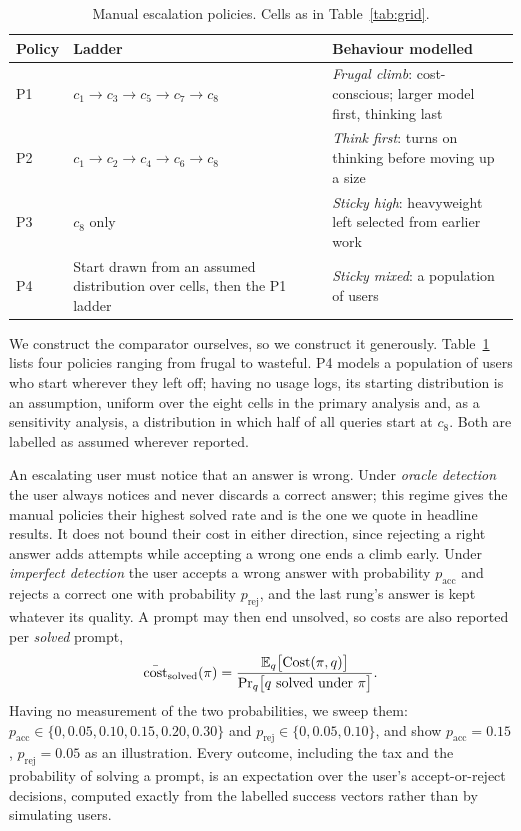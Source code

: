 \begin{table}[ht]
\centering
\caption{Manual escalation policies. Cells as in Table~\ref{tab:grid}.}
\label{tab:policies}
\begin{tabularx}{\textwidth}{@{}l p{3.4cm} >{\raggedright\arraybackslash}X@{}}
\toprule
Policy & Ladder & Behaviour modelled \\
\midrule
P1 & $c_1{\to}c_3{\to}c_5{\to}c_7{\to}c_8$ & \emph{Frugal climb}: cost-conscious; larger model first, thinking last \\
P2 & $c_1{\to}c_2{\to}c_4{\to}c_6{\to}c_8$ & \emph{Think first}: turns on thinking before moving up a size \\
P3 & $c_8$ only & \emph{Sticky high}: heavyweight left selected from earlier work \\
P4 & Start drawn from an assumed distribution over cells, then the P1 ladder & \emph{Sticky mixed}: a population of users \\
\bottomrule
\end{tabularx}
\end{table}

We construct the comparator ourselves, so we construct it generously.
Table~\ref{tab:policies} lists four policies ranging from frugal to wasteful.
P4 models a population of users who start wherever they left off; having no
usage logs, its starting distribution is an assumption, uniform over the
eight cells in the primary analysis and, as a sensitivity analysis, a
distribution in which half of all queries start at $c_8$. Both are labelled
as assumed wherever reported.

An escalating user must notice that an answer is wrong. Under \emph{oracle
detection} the user always notices and never discards a correct answer; this
regime gives the manual policies their highest solved rate and is the one we
quote in headline results. It does not bound their cost in either direction,
since rejecting a right answer adds attempts while accepting a wrong one ends
a climb early. Under \emph{imperfect detection} the user accepts a wrong
answer with probability $p_{\mathrm{acc}}$ and rejects a correct one with
probability $p_{\mathrm{rej}}$, and the last rung's answer is kept whatever
its quality. A prompt may then end unsolved, so costs are also reported per
\emph{solved} prompt,
\begin{equation}
  \bar{\mathrm{cost}}_{\mathrm{solved}}(\pi) =
  \frac{\mathbb{E}_q\bigl[\mathrm{Cost}(\pi, q)\bigr]}
       {\Pr_q\bigl[\text{$q$ solved under $\pi$}\bigr]}.
  \label{eq:persolved}
\end{equation}
Having no measurement of the two probabilities, we sweep them:
$p_{\mathrm{acc}} \in \{0, 0.05, 0.10, 0.15, 0.20, 0.30\}$ and
$p_{\mathrm{rej}} \in \{0, 0.05, 0.10\}$, and show
$p_{\mathrm{acc}} = 0.15$, $p_{\mathrm{rej}} = 0.05$ as an illustration.
Every outcome, including the tax and the probability of solving a prompt, is
an expectation over the user's accept-or-reject decisions, computed exactly
from the labelled success vectors rather than by simulating users.

